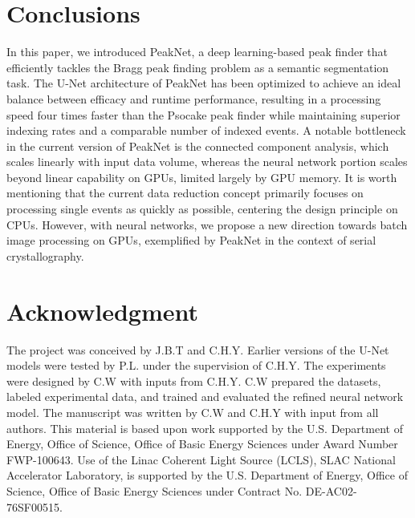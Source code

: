 \documentclass[conference]{IEEEtran}
\newcommand{\peaknet}{PeakNet}
\newcommand{\psocake}{Psocake}
\begin{document}

\section{Conclusions}

In this paper, we introduced \peaknet{}, a deep learning-based peak finder that
efficiently tackles the Bragg peak finding problem as a semantic segmentation
task. The U-Net architecture of \peaknet{} has been optimized to achieve an
ideal balance between efficacy and runtime performance, resulting in a
processing speed four times faster than the \psocake{} peak finder while
maintaining superior indexing rates and a comparable number of indexed events. A
notable bottleneck in the current version of \peaknet{} is the connected
component analysis, which scales linearly with input data volume, whereas the
neural network portion scales beyond linear capability on GPUs, limited largely
by GPU memory. It is worth mentioning that the current data reduction concept
primarily focuses on processing single events as quickly as possible, centering
the design principle on CPUs. However, with neural networks, we propose a new
direction towards batch image processing on GPUs, exemplified by \peaknet{} in
the context of serial crystallography.


\section*{Acknowledgment}

The project was conceived by J.B.T and C.H.Y. Earlier versions of the U-Net
models were tested by P.L. under the supervision of C.H.Y.  The experiments were
designed by C.W with inputs from C.H.Y.  C.W prepared the datasets, labeled
experimental data, and trained and evaluated the refined neural network model.
The manuscript was written by C.W and C.H.Y with input from all authors.  This
material is based upon work supported by the U.S.  Department of Energy, Office
of Science, Office of Basic Energy Sciences under Award Number FWP-100643.  Use
of the Linac Coherent Light Source (LCLS), SLAC National Accelerator Laboratory,
is supported by the U.S. Department of Energy, Office of Science, Office of
Basic Energy Sciences under Contract No.  DE-AC02-76SF00515.



\end{document}
